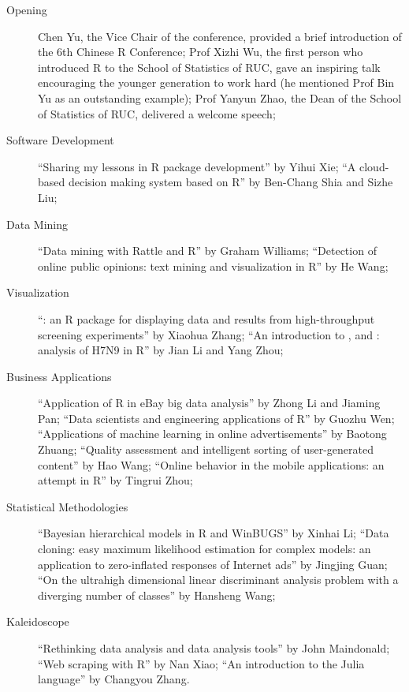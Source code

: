 \begin{description}

\item[Opening] Chen Yu, the Vice Chair of the conference, provided a brief
introduction of the 6th Chinese R Conference; Prof Xizhi Wu, the first
person who introduced R to the School of Statistics of RUC, gave an
inspiring talk encouraging the younger generation to work hard (he mentioned
Prof Bin Yu as an outstanding example); Prof Yanyun Zhao, the Dean of the
School of Statistics of RUC, delivered a welcome speech;

\item[Software Development] ``Sharing my lessons in R package development''
by Yihui Xie; ``A cloud-based decision making system based on R'' by
Ben-Chang Shia and Sizhe Liu;

\item[Data Mining] ``Data mining with Rattle and R'' by Graham Williams;
``Detection of online public opinions: text mining and visualization in R''
by He Wang;

\item[Visualization] ``: an R package for displaying data
and results from high-throughput screening experiments'' by Xiaohua Zhang;
``An introduction to ,  and :
analysis of H7N9 in R'' by Jian Li and Yang Zhou;

\item[Business Applications]	``Application of R in eBay big data analysis''
by Zhong Li and Jiaming Pan; ``Data scientists and engineering applications
of R'' by Guozhu Wen; ``Applications of machine learning in online
advertisements'' by Baotong Zhuang; ``Quality assessment and intelligent
sorting of user-generated content'' by Hao Wang;  ``Online behavior in the
mobile applications: an attempt in R'' by Tingrui Zhou;

\item[Statistical Methodologies]	``Bayesian hierarchical models in R and
WinBUGS'' by Xinhai Li; ``Data cloning: easy maximum likelihood estimation
for complex models: an application to zero-inflated responses of Internet
ads'' by Jingjing Guan; ``On the ultrahigh dimensional linear discriminant
analysis problem with a diverging number of classes'' by Hansheng Wang;

\item[Kaleidoscope]	``Rethinking data analysis and data analysis tools'' by
John Maindonald; ``Web scraping with R'' by Nan Xiao; ``An introduction to
the Julia language'' by Changyou Zhang.

\end{description}

